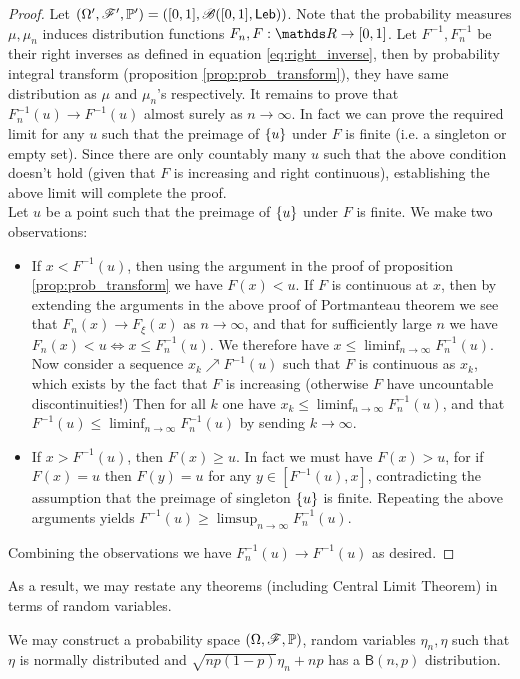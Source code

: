 \begin{proof}
Let $(\Omega',\mathcal{F}',\mathbb{P}') = ([0,1], \mathcal{B}([0,1], \mathsf{Leb}))$. Note that the probability measures $\mu, \mu_n$ induces distribution functions $F_n, F: \R \to [0,1]$. Let $F^{-1}, F_n^{-1}$ be their right inverses as defined in equation \ref{eq:right_inverse}, then by probability integral transform (proposition \ref{prop:prob_transform}), they have same distribution as $\mu$ and $\mu_n$'s respectively. It remains to prove that $F_n^{-1}(u) \to F^{-1}(u)$ almost surely as $n \to \infty$. In fact we can prove the required limit for any $u$ such that the preimage of $\left\{ u \right \}$ under $F$ is finite (i.e. a singleton or empty set). Since there are only countably many $u$ such that the above condition doesn't hold (given that $F$ is increasing and right continuous), establishing the above limit will complete the proof. \\

Let $u$ be a point such that the preimage of $\left\{ u \right \}$ under $F$ is finite. We make two observations:
\begin{itemize}
\item If $x < F^{-1}(u)$, then using the argument in the proof of proposition \ref{prop:prob_transform} we have $F(x) < u$. If $F$ is continuous at $x$, then by extending the arguments in the above proof of Portmanteau theorem we see that $F_n(x) \to F_\xi(x)$ as $n \to \infty$, and that for sufficiently large $n$ we have $F_n(x) < u \iff x \leq F_n^{-1}(u)$. We therefore have $x \leq \liminf_{n\to\infty} F_n^{-1}(u)$. Now consider a sequence $x_k \nearrow F^{-1}(u)$ such that $F$ is continuous as $x_k$, which exists by the fact that $F$ is increasing (otherwise $F$ have uncountable discontinuities!) Then for all $k$ one have $x_k \leq \liminf_{n\to\infty} F_n^{-1}(u)$, and that $F^{-1}(u) \leq \liminf_{n\to\infty} F_n^{-1}(u)$ by sending $k \to \infty$.
\item If $x > F^{-1}(u)$, then $F(x) \geq u$. In fact we must have $F(x) > u$, for if $F(x) = u$ then $F(y) = u$ for any $y \in [F^{-1}(u), x]$, contradicting the assumption that the preimage of singleton $\left\{ u \right \}$ is finite. Repeating the above arguments yields $F^{-1}(u) \geq \limsup_{n\to\infty} F_n^{-1}(u)$.
\end{itemize}
Combining the observations we have $F_n^{-1}(u) \to F^{-1}(u)$ as desired.
\end{proof}

As a result, we may restate any theorems (including Central Limit Theorem) in terms of random variables.
\begin{example}
We may construct a probability space $(\Omega, \mathcal{F}, \mathbb{P})$, random variables $\eta_n, \eta$ such that $\eta$ is normally distributed and $\sqrt{np(1-p)}\eta_n + np$ has a $\mathsf{B}(n,p)$ distribution. 
\end{example}

